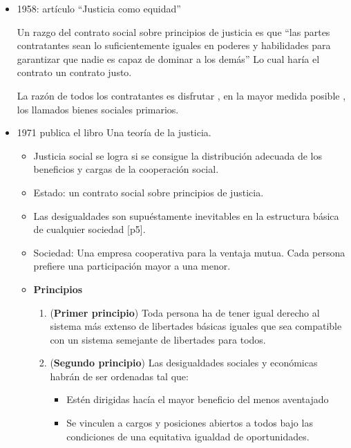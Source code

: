 \documentclass[
  letterpaper,
  DIV=11,
  numbers=noendperiod]{scrreprt}
\begin{document}
\begin{itemize}
\item
  1958: artículo ``Justicia como equidad''

  Un razgo del contrato social sobre principios de justicia es que ``las
  partes contratantes sean lo suficientemente iguales en poderes y
  habilidades para garantizar que nadie es capaz de dominar a los
  demás'' Lo cual haría el contrato un contrato justo.

  La razón de todos los contratantes es disfrutar , en la mayor medida
  posible , los llamados bienes sociales primarios.
\item
  1971 publica el libro Una teoría de la justicia.

  \begin{itemize}
  \item
    Justicia social se logra si se consigue la distribución adecuada de
    los beneficios y cargas de la cooperación social.
  \item
    Estado: un contrato social sobre principios de justicia.
  \item
    Las desigualdades son supuéstamente inevitables en la estructura
    básica de cualquier sociedad {[}p5{]}.
  \item
    Sociedad: Una empresa cooperativa para la ventaja mutua. Cada
    persona prefiere una participación mayor a una menor.
  \item
    \textbf{Principios}

    \begin{enumerate}
    \def\labelenumi{\arabic{enumi}.}
    \item
      (\textbf{Primer principio}) Toda persona ha de tener igual derecho
      al sistema más extenso de libertades básicas iguales que sea
      compatible con un sistema semejante de libertades para todos.
    \item
      (\textbf{Segundo principio}) Las desigualdades sociales y
      económicas habrán de ser ordenadas tal que:

      \begin{itemize}
      \item
        Estén dirigidas hacía el mayor beneficio del menos aventajado
      \item
        Se vinculen a cargos y posiciones abiertos a todos bajo las
        condiciones de una equitativa igualdad de oportunidades.
      \end{itemize}
    \end{enumerate}


\end{itemize}
\end{itemize}
\end{document}
